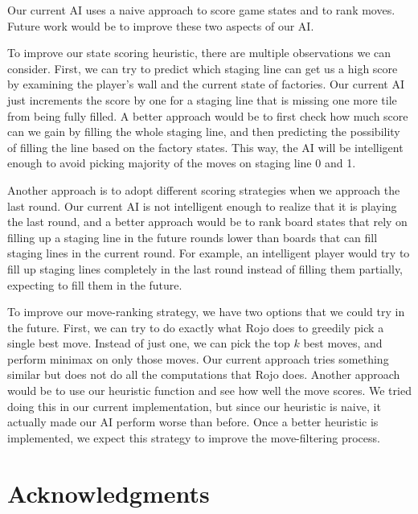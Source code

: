 \documentclass[12pt]{article}
\begin{document}
Our current AI uses a naive approach to score game states and to rank moves. Future work would be to improve these two
aspects of our AI.

To improve our state scoring heuristic, there are multiple observations we can consider. 
First, we can try to predict which staging line can get us a high score by examining the player's wall 
and the current state of factories. Our current AI just increments the score by one for a staging line that is missing 
one more tile from being fully filled.
A better approach would be to first check how much score can we gain by filling the whole staging line,
and then predicting the possibility of filling the line based on the factory states. This way, the AI will be
intelligent enough to avoid picking majority of
the moves on staging line 0 and 1.

Another approach is to adopt different scoring strategies when we approach the last round. Our current AI is not intelligent enough
to realize that it is playing the last round,
and a better approach would be to rank board states that rely on filling up a staging line in the
future rounds lower than boards that can fill staging lines in the current round. For example, 
an intelligent player would try to fill up staging lines completely
in the last round instead of filling them partially, expecting
to fill them in the future.

To improve our move-ranking strategy, we have two options that we could try in the future. 
First, we can try to do exactly what Rojo does to greedily pick a single best move.
Instead of just one, we can pick the top $k$ best moves, and perform minimax on only those moves.
Our current approach tries something similar but does not do all the computations that Rojo does.
Another approach would be to use our heuristic function and see how well the move scores.
We tried doing this in our current implementation, but since our heuristic is naive, it actually made our AI
perform worse than before. Once a better heuristic is implemented, we expect this strategy to improve the move-filtering process.


%


\section{Acknowledgments}
\end{document}
